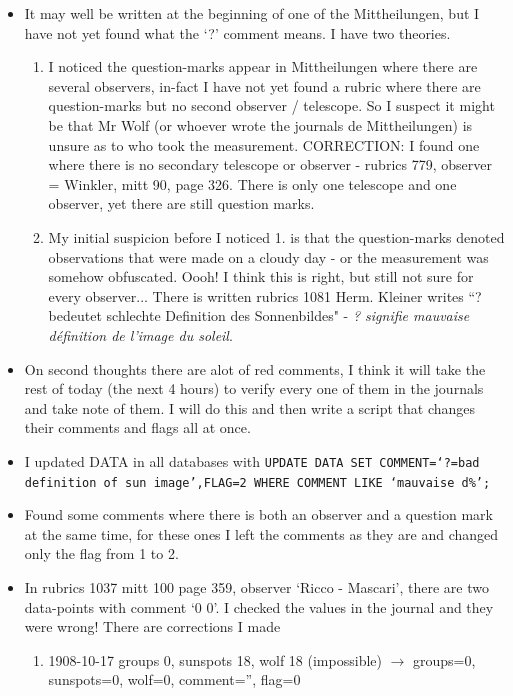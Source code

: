 \documentclass[12pt]{article}
\begin{document}
\begin{itemize}
    \item It may well be written at the beginning of one of the Mittheilungen, but I have not yet found what the `?' comment means. I have two theories.\label{what is flag 2 question mark}
    \begin{enumerate}
        \item I noticed the question-marks appear in Mittheilungen where there are several observers, in-fact I have not yet found a rubric where there are question-marks but no second observer / telescope. So I suspect it might be that Mr Wolf (or whoever wrote the journals de Mittheilungen) is unsure as to who took the measurement. CORRECTION: I found one where there is no secondary telescope or observer - rubrics 779, observer = Winkler, mitt 90, page 326. There is only one telescope and one observer, yet there are still question marks.
        \item My initial suspicion before I noticed 1. is that the question-marks denoted observations that were made on a cloudy day - or the measurement was somehow obfuscated. Oooh! I think this is right, but still not sure for every observer... There is written rubrics 1081 Herm. Kleiner writes ``? bedeutet schlechte Definition des Sonnenbildes" - \textit{? signifie mauvaise définition de l'image du soleil}.
    \end{enumerate}
    \item On second thoughts there are alot of red comments, I think it will take the rest of today (the next 4 hours) to verify every one of them in the journals and take note of them. I will do this and then write a script that changes their comments and flags all at once.
    \item I updated DATA in all databases with \texttt{UPDATE DATA SET COMMENT=`?=bad definition of sun image',FLAG=2 WHERE COMMENT LIKE `mauvaise d\%';}
    \item Found some comments where there is both an observer and a question mark at the same time, for these ones I left the comments as they are and changed only the flag from 1 to 2.
    \item In rubrics 1037 mitt 100 page 359, observer `Ricco - Mascari', there are two data-points with comment `0 0'. I checked the values in the journal and they were wrong! There are corrections I made
    \begin{enumerate}
        \item 1908-10-17 groups 0, sunspots 18, wolf 18 (impossible) $\to$ groups=0, sunspots=0, wolf=0, comment='', flag=0

\end{enumerate}
\end{itemize}
\end{document}
